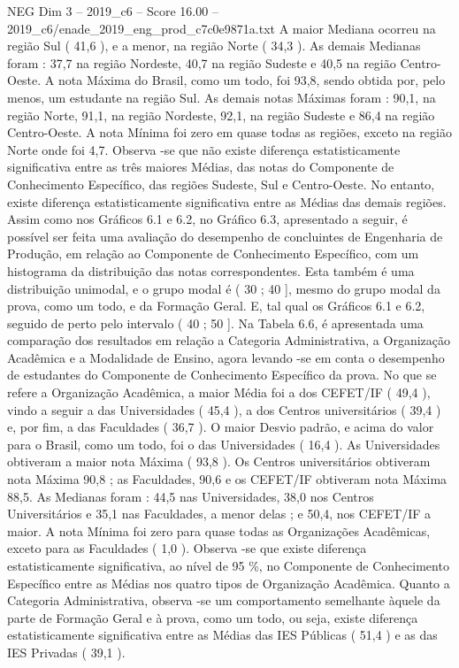 \begin{textsample}{NEG Dim 3 – 2019\_c6 – Score 16.00 – 2019\_c6/enade\_2019\_eng\_prod\_c7c0e9871a.txt}
A maior Mediana ocorreu na região Sul ( 41,6 ), e a menor, na região Norte ( 34,3 ).
As demais Medianas foram : 37,7 na região Nordeste, 40,7 na região Sudeste e 40,5 na região Centro-Oeste.
A nota Máxima do Brasil, como um todo, foi 93,8, sendo obtida por, pelo menos, um estudante na região Sul.
As demais notas Máximas foram : 90,1, na região Norte, 91,1, na região Nordeste, 92,1, na região Sudeste e 86,4 na região Centro-Oeste.
A nota Mínima foi zero em quase todas as regiões, exceto na região Norte onde foi 4,7.
Observa -se que não existe diferença estatisticamente significativa entre as três maiores Médias, das notas do Componente de Conhecimento Específico, das regiões Sudeste, Sul e Centro-Oeste.
No entanto, existe diferença estatisticamente significativa entre as Médias das demais regiões.
Assim como nos Gráficos 6.1 e 6.2, no Gráfico 6.3, apresentado a seguir, é possível ser feita uma avaliação do desempenho de concluintes de Engenharia de Produção, em relação ao Componente de Conhecimento Específico, com um histograma da distribuição das notas correspondentes.
Esta também é uma distribuição unimodal, e o grupo modal é ( 30 ; 40 ], mesmo do grupo modal da prova, como um todo, e da Formação Geral.
E, tal qual os Gráficos 6.1 e 6.2, seguido de perto pelo intervalo ( 40 ; 50 ].
Na Tabela 6.6, é apresentada uma comparação dos resultados em relação a Categoria Administrativa, a Organização Acadêmica e a Modalidade de Ensino, agora levando -se em conta o desempenho de estudantes do Componente de Conhecimento Específico da prova.
No que se refere a Organização Acadêmica, a maior Média foi a dos CEFET/IF ( 49,4 ), vindo a seguir a das Universidades ( 45,4 ), a dos Centros universitários ( 39,4 ) e, por fim, a das Faculdades ( 36,7 ).
O maior Desvio padrão, e acima do valor para o Brasil, como um todo, foi o das Universidades ( 16,4 ).
As Universidades obtiveram a maior nota Máxima ( 93,8 ).
Os Centros universitários obtiveram nota Máxima 90,8 ; as Faculdades, 90,6 e os CEFET/IF obtiveram nota Máxima 88,5.
As Medianas foram : 44,5 nas Universidades, 38,0 nos Centros Universitários e 35,1 nas Faculdades, a menor delas ; e 50,4, nos CEFET/IF a maior.
A nota Mínima foi zero para quase todas as Organizações Acadêmicas, exceto para as Faculdades ( 1,0 ).
Observa -se que existe diferença estatisticamente significativa, ao nível de 95 \%, no Componente de Conhecimento Específico entre as Médias nos quatro tipos de Organização Acadêmica.
Quanto a Categoria Administrativa, observa -se um comportamento semelhante àquele da parte de Formação Geral e à prova, como um todo, ou seja, existe diferença estatisticamente significativa entre as Médias das IES Públicas ( 51,4 ) e as das IES Privadas ( 39,1 ).

\end{textsample}
